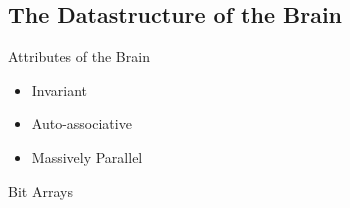 
\subsection{The Datastructure of the Brain}


\begin{frame}[c]{Attributes of the Brain}
    \begin{itemize}[<+(1)->]
        \item Invariant
        \item Auto-associative
        \item Massively Parallel
    \end{itemize}
\end{frame}



\begin{frame}[c]{Bit Arrays}
    \Large
    \pause
\end{frame}


